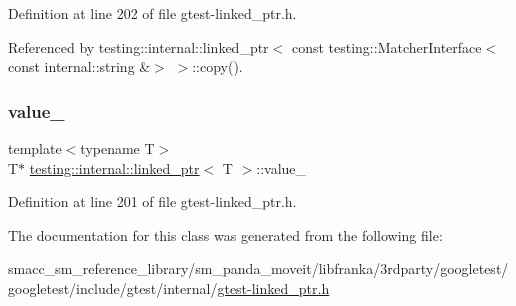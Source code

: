 Definition at line 202 of file gtest-\/linked\+\_\+ptr.\+h.



Referenced by testing\+::internal\+::linked\+\_\+ptr$<$ const testing\+::\+Matcher\+Interface$<$ const internal\+::string \&$>$ $>$\+::copy().

\mbox{\label{classtesting_1_1internal_1_1linked__ptr_abb52c4e944fc7a24a4ec7788b612fb37}} 
\subsubsection{\texorpdfstring{value\+\_\+}{value\_}}
{\footnotesize\ttfamily template$<$typename T$>$ \\
T$\ast$ \hyperlink{classtesting_1_1internal_1_1linked__ptr}{testing\+::internal\+::linked\+\_\+ptr}$<$ T $>$\+::value\+\_\+\hspace{0.3cm}{\ttfamily [private]}}



Definition at line 201 of file gtest-\/linked\+\_\+ptr.\+h.



The documentation for this class was generated from the following file\+:\begin{DoxyCompactItemize}
\item 
smacc\+\_\+sm\+\_\+reference\+\_\+library/sm\+\_\+panda\+\_\+moveit/libfranka/3rdparty/googletest/googletest/include/gtest/internal/\hyperlink{gtest-linked__ptr_8h}{gtest-\/linked\+\_\+ptr.\+h}\end{DoxyCompactItemize}
